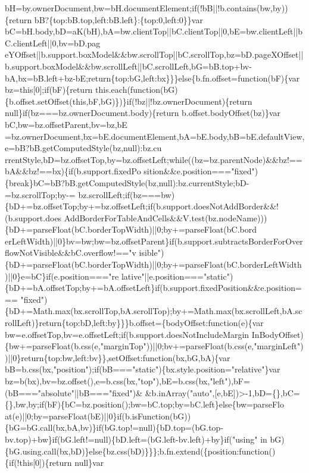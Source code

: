 \begin{DoxyCode}
{       bH=by.ownerDocument,bw=bH.documentElement;if(!bB||!b.contains(bw,by))\{return
       bB?\{top:bB.top,left:bB.left\}:\{top:0,left:0\}\}var
       bC=bH.body,bD=aK(bH),bA=bw.clientTop||bC.clientTop||0,bE=bw.clientLeft||bC.clientLeft||0,bv=bD.pag
      eYOffset||b.support.boxModel&&bw.scrollTop||bC.scrollTop,bz=bD.pageXOffset||b.support.boxModel&&bw.scrollLeft||bC.scrollLeft,bG=bB.top+bv-bA,bx=bB.left+bz-bE;return\{top:bG,left:bx\}\}\}else\{b.fn.offset=function(bF)\{var
       bz=this[0];if(bF)\{return
       this.each(function(bG)\{b.offset.setOffset(this,bF,bG)\})\}if(!bz||!bz.ownerDocument)\{return null\}if(bz===bz.ownerDocument.body)\{return b.offset.bodyOffset(bz)\}var
       bC,bw=bz.offsetParent,bv=bz,bE
      =bz.ownerDocument,bx=bE.documentElement,bA=bE.body,bB=bE.defaultView,e=bB?bB.getComputedStyle(bz,null):bz.cu
      rrentStyle,bD=bz.offsetTop,by=bz.offsetLeft;while((bz=bz.parentNode)&&bz!==bA&&bz!==bx)\{if(b.support.fixedPo
      sition&&e.position==="fixed")\{break\}bC=bB?bB.getComputedStyle(bz,null):bz.currentStyle;bD-=bz.scrollTop;by-=
      bz.scrollLeft;if(bz===bw)\{bD+=bz.offsetTop;by+=bz.offsetLeft;if(b.support.doesNotAddBorder&&!(b.support.does
      AddBorderForTableAndCells&&V.test(bz.nodeName)))\{bD+=parseFloat(bC.borderTopWidth)||0;by+=parseFloat(bC.bord
      erLeftWidth)||0\}bv=bw;bw=bz.offsetParent\}if(b.support.subtractsBorderForOverflowNotVisible&&bC.overflow!=="v
      isible")\{bD+=parseFloat(bC.borderTopWidth)||0;by+=parseFloat(bC.borderLeftWidth)||0\}e=bC\}if(e.position==="re
      lative"||e.position==="static")\{bD+=bA.offsetTop;by+=bA.offsetLeft\}if(b.support.fixedPosition&&e.position===
      "fixed")\{bD+=Math.max(bx.scrollTop,bA.scrollTop);by+=Math.max(bx.scrollLeft,bA.scrollLeft)\}return\{top:bD,left:by\}\}\}b.offset=\{bodyOffset:function(e)\{var
       bw=e.offsetTop,bv=e.offsetLeft;if(b.support.doesNotIncludeMargin
      InBodyOffset)\{bw+=parseFloat(b.css(e,"marginTop"))||0;bv+=parseFloat(b.css(e,"marginLeft"))||0\}return\{top:bw,left:bv\}\},setOffset:function(bx,bG,bA)\{var
       bB=b.css(bx,"position");if(bB==="static")\{bx.style.position="relative"\}var
       bz=b(bx),bv=bz.offset(),e=b.css(bx,"top"),bE=b.css(bx,"left"),bF=(bB==="absolute"||bB==="fixed")&
      &b.inArray("auto",[e,bE])>-1,bD=\{\},bC=\{\},bw,by;if(bF)\{bC=bz.position();bw=bC.top;by=bC.left\}else\{bw=parseFlo
      at(e)||0;by=parseFloat(bE)||0\}if(b.isFunction(bG))\{bG=bG.call(bx,bA,bv)\}if(bG.top!=null)\{bD.top=(bG.top-bv.top)+bw\}if(bG.left!=null)\{bD.left=(bG.left-bv.left)+by\}if("using" in
       bG)\{bG.using.call(bx,bD)\}else\{bz.css(bD)\}\}\};b.fn.extend(\{position:function()\{if(!this[0])\{return null\}var
}
\end{DoxyCode}
